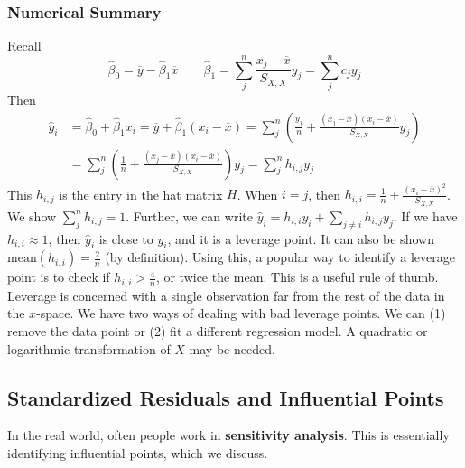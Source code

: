 \documentclass[12pt, a4paper]{article}
\theoremstyle{definition}
\newcommand{\ol}{\overline}
\newcommand{\f}{\frac}
\newcommand{\BB}[1]{\left(#1\right)}
\begin{document}
	\subsubsection{Numerical Summary}
	Recall
	$$
		\hat\beta_0 = \ol y - \hat \beta_1 \ol x \qquad \hat\beta_1 = \sum_j^n \f{x_j - \ol x}{S_{X,X}} y_j = \sum_j^n c_jy_j
	$$
	Then
	\begin{align*}
		\hat y_i &= \hat \beta_0 + \hat \beta_1 x_i = \ol y + \hat \beta_1 (x_i - \ol x) = \sum_j^n \BB{\f{y_j}{n} + \f{(x_j - \ol x) (x_i - \ol x)}{S_{X,X}} y_j} \\
		&= \sum_j^n \BB{\f{1}{n} + \f{(x_j - \ol x) (x_i - \ol x)}{S_{X,X}} } y_j = \sum_j^n h_{i,j} y_j
	\end{align*}
	This $h_{i,j}$ is the entry in the hat matrix $H$. When $i = j$, then $\displaystyle h_{i,i} = \f{1}{n} + \f{ (x_i - \ol x)^2}{S_{X,X}}$. We show $\sum_j^n h_{i,j} = 1$. Further, we can write $\hat y_i = h_{i,i} y_i + \sum_{j \neq i} h_{i,j}y_j$. If we have $h_{i,i} \approx 1$, then $\hat y_i$ is close to $y_i$, and it is a leverage point. It can also be shown $\text{mean}(h_{i,i}) = \f2n$ (by definition). Using this, a popular way to identify a leverage point is to check if $h_{i,i} > \f4n$, or twice the mean. This is a useful rule of thumb.\\
	
	Leverage is concerned with a single observation far from the rest of the data in the $x$-space. We have two ways of dealing with bad leverage points. We can (1) remove the data point or (2) fit a different regression model. A quadratic or logarithmic transformation of $X$ may be needed.
	
	\subsection{Standardized Residuals and Influential Points}
	
	In the real world, often people work in {\bf sensitivity analysis}. This is essentially identifying influential points, which we discuss.\\
	
\end{document}
